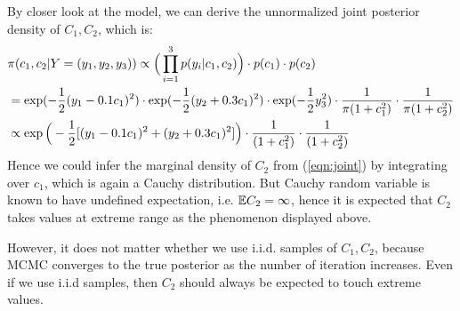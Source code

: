 \documentclass{article}
\begin{document}
By closer look at the model, we can derive the unnormalized joint posterior density of $C_1, C_2$, which is:
\begin{align}
& \pi(c_1, c_2 | Y = (y_1, y_2, y_3)) \propto \Big(\prod_{i=1}^3 p(y_i |c_1, c_2)\Big) \cdot p(c_1) \cdot p(c_2) \notag\\
& = \exp(-\frac12 (y_1-0.1c_1)^2) \cdot \exp(-\frac12 (y_2+0.3c_1)^2)  \cdot \exp(-\frac12 y_3^2) \cdot \frac{1}{\pi(1+c_1^2)} \cdot \frac{1}{\pi(1+c_2^2)} \notag\\
&\propto \exp\Big(-\frac12 [(y_1-0.1c_1)^2 + (y_2+0.3c_1)^2]\Big) \cdot \frac{1}{(1+c_1^2)} \cdot \frac{1}{(1+c_2^2)} \label{eqn:joint}
\end{align}
Hence we could infer the marginal density of $C_2$ from (\ref{eqn:joint}) by integrating over $c_1$, which is again a Cauchy distribution. But Cauchy random variable is known to have undefined expectation, i.e. $\mathbb{E} C_2 = \infty$, hence it is expected that $C_2$ takes values at extreme range as the phenomenon displayed above.

However, it does not matter whether we use i.i.d. samples of $C_1, C_2$, because MCMC converges to the true posterior as the number of iteration increases. Even if we use i.i.d samples, then $C_2$ should always be expected to touch extreme values.







 
\end{document}
